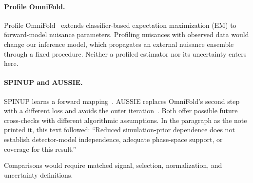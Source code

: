 \paragraph{Profile OmniFold.} Profile OmniFold~\cite{Zhu:2025profile} extends classifier-based expectation maximization (EM) to forward-model nuisance parameters. Profiling nuisances with observed data would change our inference model, which propagates an external nuisance ensemble through a fixed procedure. Neither a profiled estimator nor its uncertainty enters here.

\paragraph{SPINUP and AUSSIE.} SPINUP learns a forward mapping~\cite{Butter:2025spinup}. AUSSIE replaces OmniFold's second step with a different loss and avoids the outer iteration~\cite{Ore:2026aussie}. Both offer possible future cross-checks with different algorithmic assumptions. In the paragraph as the note printed it, this text followed: ``Reduced simulation-prior dependence does not establish detector-model independence, adequate phase-space support, or coverage for this result.''\par Comparisons would require matched signal, selection, normalization, and uncertainty definitions.
